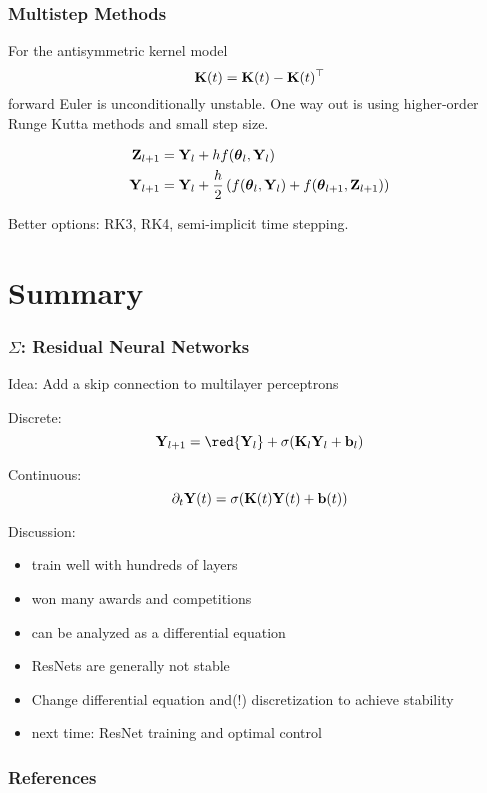 \documentclass[12pt,fleqn,beamer]{beamer}
\begin{document}
\begin{frame}
	\frametitle{Multistep Methods}

	For the antisymmetric kernel model
	$$
				{\bf K}(t) = {\bf K}(t) - {\bf K}(t)^\top
	$$
	forward Euler is unconditionally unstable. One way out is using higher-order Runge Kutta methods and small step size. 
	
	\bigskip
	
	\begin{align*}
		{\bf Z}_{l+1} & = {\bf Y}_l + h f({\boldsymbol \theta}_l, {\bf Y}_l) \\
		{\bf Y}_{l+1} & = {\bf Y}_l + \frac{h}{2} \left( f({\boldsymbol \theta}_l, {\bf Y}_l) + f({\boldsymbol \theta}_{l+1}, {\bf Z}_{l+1}) \right)
	\end{align*}
	
	Better options: RK3, RK4, semi-implicit time stepping.
\end{frame}

\section{Summary} %
\label{sec:numerical_optimization}
\begin{frame}[fragile]\frametitle{$\Sigma$: Residual Neural Networks}

Idea: Add a skip connection to multilayer perceptrons

Discrete:
\begin{equation*}
	\bfY_{l+1} = \red{\bfY_{l}} + \sigma(\bfK_l \bfY_l + \bfb_l)
\end{equation*}

Continuous:
\begin{equation*}
	\partial_t {\bf Y}(t) = \sigma({\bf K}(t) {\bf Y}(t) + {\bf b}(t))
\end{equation*}


Discussion:
\begin{itemize}
	\item train well with hundreds of layers
	\item won many awards and competitions
	\item can be analyzed as a differential equation
	\item ResNets are generally not stable
	\item Change differential equation and(!) discretization to achieve stability
	\item next time: ResNet training and optimal control
\end{itemize}
\end{frame}

\begin{frame}[allowframebreaks]
	\frametitle{References}



\end{frame}
\end{document}
